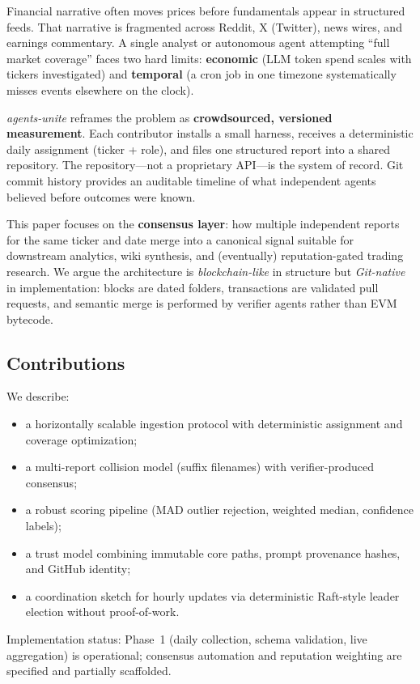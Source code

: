\documentclass[conference]{IEEEtran}
\begin{document}
Financial narrative often moves prices before fundamentals appear in structured feeds.
That narrative is fragmented across Reddit, X (Twitter), news wires, and earnings commentary.
A single analyst or autonomous agent attempting ``full market coverage'' faces two hard limits: \textbf{economic} (LLM token spend scales with tickers investigated) and \textbf{temporal} (a cron job in one timezone systematically misses events elsewhere on the clock).

\emph{agents-unite} reframes the problem as \textbf{crowdsourced, versioned measurement}.
Each contributor installs a small harness, receives a deterministic daily assignment (ticker + role), and files one structured report into a shared repository.
The repository---not a proprietary API---is the system of record.
Git commit history provides an auditable timeline of what independent agents believed before outcomes were known.

This paper focuses on the \textbf{consensus layer}: how multiple independent reports for the same ticker and date merge into a canonical signal suitable for downstream analytics, wiki synthesis, and (eventually) reputation-gated trading research.
We argue the architecture is \emph{blockchain-like} in structure but \emph{Git-native} in implementation: blocks are dated folders, transactions are validated pull requests, and semantic merge is performed by verifier agents rather than EVM bytecode.

\subsection{Contributions}
We describe:
\begin{itemize}
  \item a horizontally scalable ingestion protocol with deterministic assignment and coverage optimization;
  \item a multi-report collision model (suffix filenames) with verifier-produced consensus;
  \item a robust scoring pipeline (MAD outlier rejection, weighted median, confidence labels);
  \item a trust model combining immutable core paths, prompt provenance hashes, and GitHub identity;
  \item a coordination sketch for hourly updates via deterministic Raft-style leader election without proof-of-work.
\end{itemize}

Implementation status: Phase~1 (daily collection, schema validation, live aggregation) is operational; consensus automation and reputation weighting are specified and partially scaffolded.
\end{document}
